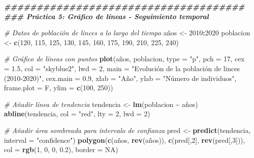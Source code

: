 \documentclass[
]{article}
\newenvironment{Shaded}{\begin{snugshade}}{\end{snugshade}}
\newcommand{\AttributeTok}[1]{\textcolor[rgb]{0.13,0.29,0.53}{#1}}
\newcommand{\CommentTok}[1]{\textcolor[rgb]{0.56,0.35,0.01}{\textit{#1}}}
\newcommand{\ConstantTok}[1]{\textcolor[rgb]{0.56,0.35,0.01}{#1}}
\newcommand{\DecValTok}[1]{\textcolor[rgb]{0.00,0.00,0.81}{#1}}
\newcommand{\DocumentationTok}[1]{\textcolor[rgb]{0.56,0.35,0.01}{\textbf{\textit{#1}}}}
\newcommand{\FloatTok}[1]{\textcolor[rgb]{0.00,0.00,0.81}{#1}}
\newcommand{\FunctionTok}[1]{\textcolor[rgb]{0.13,0.29,0.53}{\textbf{#1}}}
\newcommand{\NormalTok}[1]{#1}
\newcommand{\OtherTok}[1]{\textcolor[rgb]{0.56,0.35,0.01}{#1}}
\newcommand{\SpecialCharTok}[1]{\textcolor[rgb]{0.81,0.36,0.00}{\textbf{#1}}}
\newcommand{\StringTok}[1]{\textcolor[rgb]{0.31,0.60,0.02}{#1}}
\begin{document}
\begin{Shaded}
\begin{Highlighting}[]
\DocumentationTok{\#\#\#\#\#\#\#\#\#\#\#\#\#\#\#\#\#\#\#\#\#\#\#\#\#\#\#\#\#\#\#\#\#\#\#\#\#}
\DocumentationTok{\#\#\# Práctica 5: Gráfico de líneas {-} Seguimiento temporal}

\CommentTok{\# Datos de población de linces a lo largo del tiempo}
\NormalTok{años }\OtherTok{\textless{}{-}} \DecValTok{2010}\SpecialCharTok{:}\DecValTok{2020}
\NormalTok{poblacion }\OtherTok{\textless{}{-}} \FunctionTok{c}\NormalTok{(}\DecValTok{120}\NormalTok{, }\DecValTok{115}\NormalTok{, }\DecValTok{125}\NormalTok{, }\DecValTok{130}\NormalTok{, }\DecValTok{145}\NormalTok{, }\DecValTok{160}\NormalTok{, }\DecValTok{175}\NormalTok{, }\DecValTok{190}\NormalTok{, }\DecValTok{210}\NormalTok{, }\DecValTok{225}\NormalTok{, }\DecValTok{240}\NormalTok{)}

\CommentTok{\# Gráfico de líneas con puntos}
\FunctionTok{plot}\NormalTok{(años, poblacion,}
     \AttributeTok{type =} \StringTok{"p"}\NormalTok{,}
     \AttributeTok{pch =} \DecValTok{17}\NormalTok{,}
     \AttributeTok{cex =} \FloatTok{1.5}\NormalTok{,}
     \AttributeTok{col =} \StringTok{"skyblue2"}\NormalTok{,}
     \AttributeTok{lwd =} \DecValTok{2}\NormalTok{,}
     \AttributeTok{main =} \StringTok{"Evolución de la población de linces (2010{-}2020)"}\NormalTok{,}
     \AttributeTok{cex.main  =} \FloatTok{0.9}\NormalTok{,}
     \AttributeTok{xlab =} \StringTok{"Año"}\NormalTok{,}
     \AttributeTok{ylab =} \StringTok{"Número de individuos"}\NormalTok{,}
     \AttributeTok{frame.plot =}\NormalTok{ F,}
     \AttributeTok{ylim =} \FunctionTok{c}\NormalTok{(}\DecValTok{100}\NormalTok{, }\DecValTok{250}\NormalTok{))}

\CommentTok{\# Añadir línea de tendencia}
\NormalTok{tendencia }\OtherTok{\textless{}{-}} \FunctionTok{lm}\NormalTok{(poblacion }\SpecialCharTok{\textasciitilde{}}\NormalTok{ años)}
\FunctionTok{abline}\NormalTok{(tendencia, }\AttributeTok{col =} \StringTok{"red"}\NormalTok{, }\AttributeTok{lty =} \DecValTok{2}\NormalTok{, }\AttributeTok{lwd =} \DecValTok{2}\NormalTok{)}

\CommentTok{\# Añadir área sombreada para intervalo de confianza}
\NormalTok{pred }\OtherTok{\textless{}{-}} \FunctionTok{predict}\NormalTok{(tendencia, }\AttributeTok{interval =} \StringTok{"confidence"}\NormalTok{)}
\FunctionTok{polygon}\NormalTok{(}\FunctionTok{c}\NormalTok{(años, }\FunctionTok{rev}\NormalTok{(años)), }\FunctionTok{c}\NormalTok{(pred[,}\DecValTok{2}\NormalTok{], }\FunctionTok{rev}\NormalTok{(pred[,}\DecValTok{3}\NormalTok{])),}
        \AttributeTok{col =} \FunctionTok{rgb}\NormalTok{(}\DecValTok{1}\NormalTok{, }\DecValTok{0}\NormalTok{, }\DecValTok{0}\NormalTok{, }\FloatTok{0.2}\NormalTok{), }\AttributeTok{border =} \ConstantTok{NA}\NormalTok{)}


\end{Highlighting}
\end{Shaded}
\end{document}
